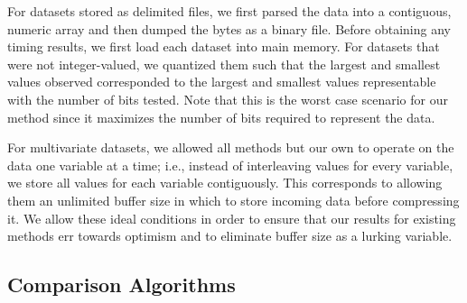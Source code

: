 
For datasets stored as delimited files, we first parsed the data into a contiguous, numeric array and then dumped the bytes as a binary file. Before obtaining any timing results, we first load each dataset into main memory.
For datasets that were not integer-valued, we quantized them such that the largest and smallest values observed corresponded to the largest and smallest values representable with the number of bits tested. Note that this is the worst case scenario for our method since it maximizes the number of bits required to represent the data.

For multivariate datasets, we allowed all methods but our own to operate on the data one variable at a time; i.e., instead of interleaving values for every variable, we store all values for each variable contiguously. This corresponds to allowing them an unlimited buffer size in which to store incoming data before compressing it. We allow these ideal conditions in order to ensure that our results for existing methods err towards optimism and to eliminate buffer size as a lurking variable.


\vspace{1mm}
\subsection{Comparison Algorithms}
\vspace{-1mm}

